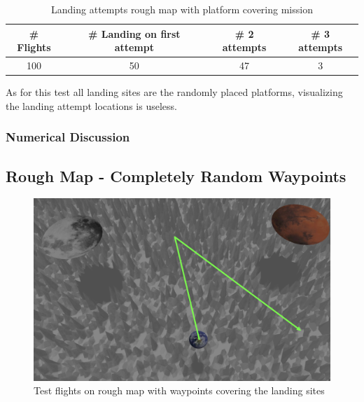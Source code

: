         \begin{table}[h]
            \begin{center}
             \caption{Landing attempts rough map with platform covering mission}\vspace{1ex}
             \label{tab:land_nums_rough_coverage}
             \begin{tabular}{|c|c|c|c|}
             \hline
             \# Flights & \# Landing on first attempt & \# 2 attempts & \# 3 attempts\\ \hline \hline
             100 & 50 & 47 & 3 \\%
             \hline
             \end{tabular}
            \end{center}
        \end{table}

        As for this test all landing sites are the randomly placed platforms, visualizing the landing attempt locations is useless.

        \subsubsection{Numerical Discussion}



    \subsection{Rough Map - Completely Random Waypoints}

    \begin{figure}[h]
        \centering
        \includegraphics[scale=0.24]{images/evaluation/rough_complete_rand.png}
        \caption{Test flights on rough map with waypoints covering the landing sites}
        \label{fig:rough_compl_rand}
    \end{figure}

